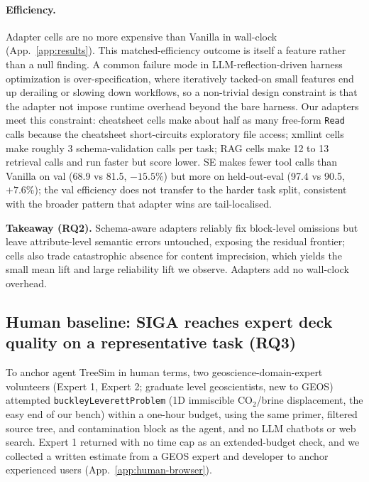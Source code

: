 \documentclass{article}
\begin{document}
\paragraph{Efficiency.}\label{subsec:efficiency} Adapter cells are no more expensive than Vanilla in wall-clock (App.~\ref{app:results}). This matched-efficiency outcome is itself a feature rather than a null finding. A common failure mode in LLM-reflection-driven harness optimization is over-specification, where iteratively tacked-on small features end up derailing or slowing down workflows, so a non-trivial design constraint is that the adapter not impose runtime overhead beyond the bare harness. Our adapters meet this constraint: cheatsheet cells make about half as many free-form \texttt{Read} calls because the cheatsheet short-circuits exploratory file access; xmllint cells make roughly 3 schema-validation calls per task; RAG cells make 12 to 13 retrieval calls and run faster but score lower. SE makes fewer tool calls than Vanilla on val (68.9 vs 81.5, ${-}15.5\%$) but more on held-out-eval (97.4 vs 90.5, $+7.6\%$); the val efficiency does not transfer to the harder task split, consistent with the broader pattern that adapter wins are tail-localised.

\textbf{Takeaway (RQ2).} Schema-aware adapters reliably fix block-level omissions but leave attribute-level semantic errors untouched, exposing the residual frontier; cells also trade catastrophic absence for content imprecision, which yields the small mean lift and large reliability lift we observe. Adapters add no wall-clock overhead.

\subsection{Human baseline: SIGA reaches expert deck quality on a representative task (RQ3)}
\label{subsec:human-baseline}

To anchor agent TreeSim in human terms, two geoscience-domain-expert volunteers (Expert 1, Expert 2; graduate level geoscientists, new to GEOS) attempted \texttt{buckleyLeverettProblem} (1D immiscible CO$_2$/brine displacement, the easy end of our bench) within a one-hour budget, using the same primer, filtered source tree, and contamination block as the agent, and no LLM chatbots or web search. Expert 1 returned with no time cap as an extended-budget check, and we collected a written estimate from a GEOS expert and developer to anchor experienced users (App.~\ref{app:human-browser}).
\end{document}
